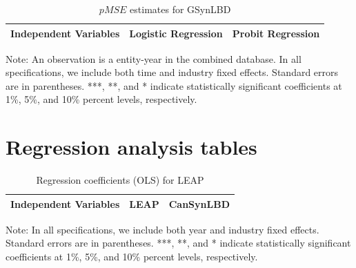 \begin{table}[H]
  \centering
 \caption{$pMSE$ estimates for GSynLBD} \label{tab:pMSE_regression} \medskip
\renewcommand{\arraystretch}{1}
\begin{tabular}{l|c |c}
\toprule
\textbf{Independent Variables}&\textbf{Logistic Regression} &\textbf{Probit Regression}\\
\midrule

   \bottomrule
  \end{tabular} 
\begin{tablenotes}
\small
\item Note: An observation is a entity-year in the combined database. In all specifications, we include both time and industry fixed effects. Standard errors are in parentheses.  ***, **, and * indicate statistically significant coefficients at 1\%, 5\%, and 10\% percent levels, respectively.
 \end{tablenotes}
\end{table}




\section{Regression analysis tables}
\label{sec:regression_tables}

\begin{table}[H]
  \centering
\begin{threeparttable}
 \caption{Regression coefficients (OLS) for LEAP} \label{OLS} \medskip
\renewcommand{\arraystretch}{1}
\begin{tabular}{l|c c| c c}
\toprule
\textbf{Independent Variables}&\multicolumn{2}{c|}{\textbf{LEAP}} &  \multicolumn{2}{c}{\textbf{CanSynLBD}}\\
\midrule

   \bottomrule
  \end{tabular} 
\begin{tablenotes}
\small
\item Note: In all specifications, we include both year and industry fixed effects. Standard errors are in parentheses.  ***, **, and * indicate statistically significant coefficients at 1\%, 5\%, and 10\% percent levels, respectively.
 \end{tablenotes}
 \end{threeparttable}
\end{table}


